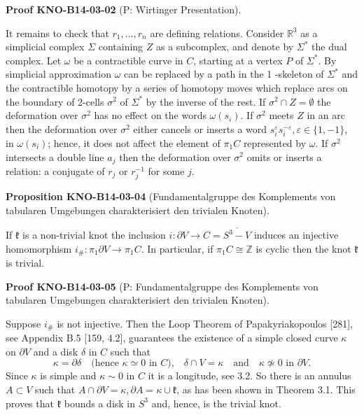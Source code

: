 \documentclass[10pt, letterpaper]{article}
\newcommand{\CustomHeading}[3]{%
  \par\medskip\noindent%
  \textbf{#1 #2} \textnormal{(#3)}.\enskip%
}
\newenvironment{PROP}[2]{\CustomHeading{Proposition}{#1}{#2}}{}
\newenvironment{PROOF}[2]{\CustomHeading{Proof}{#1}{#2}}{}
\begin{document}
\begin{PROOF}{KNO-B14-03-02}{P: Wirtinger Presentation}
It remains to check that $r_{1}, \ldots, r_{n}$ are defining relations. Consider $\mathbb{R}^{3}$ as a simplicial complex $\Sigma$ containing $Z$ as a subcomplex, and denote by $\Sigma^{*}$ the dual complex. Let $\omega$ be a contractible curve in $C$, starting at a vertex $P$ of $\Sigma^{*}$. By simplicial approximation $\omega$ can be replaced by a path in the 1 -skeleton of $\Sigma^{*}$ and the contractible homotopy by a series of homotopy moves which replace arcs on the boundary of 2-cells $\sigma^{2}$ of $\Sigma^{*}$ by the inverse of the rest. If $\sigma^{2} \cap Z=\emptyset$ the deformation over $\sigma^{2}$ has no effect on the words $\omega\left(s_{i}\right)$. If $\sigma^{2}$ meets $Z$ in an arc then the deformation over $\sigma^{2}$ either cancels or inserts a word $s_{i}^{\varepsilon} s_{i}^{-\varepsilon}, \varepsilon \in\{1,-1\}$, in $\omega\left(s_{i}\right)$; hence, it does not affect the element of $\pi_{1} C$ represented by $\omega$. If $\sigma^{2}$ intersects a double line $a_{j}$ then the deformation over $\sigma^{2}$ omits or inserts a relation: a conjugate of $r_{j}$ or $r_{j}^{-1}$ for some $j$.
\end{PROOF}

\begin{PROP}{KNO-B14-03-04}{Fundamentalgruppe des Komplements von tabularen Umgebungen charakterisiert den trivialen Knoten}
If $\mathfrak{k}$ is a non-trivial knot the inclusion $i: \partial V \rightarrow C=\overline{S^{3}-V}$ induces an injective homomorphism $i_{\#}: \pi_{1} \partial V \rightarrow \pi_{1} C$. In particular, if $\pi_{1} C \cong \mathbb{Z}$ is cyclic then the knot $\mathfrak{k}$ is trivial.
\end{PROP}

\begin{PROOF}{KNO-B14-03-05}{P: Fundamentalgruppe des Komplements von tabularen Umgebungen charakterisiert den trivialen Knoten}
Suppose $i_{\#}$ is not injective. Then the Loop Theorem of Papakyriakopoulos [281], see Appendix B.5 [159, 4.2], guarantees the existence of a simple closed curve $\kappa$ on $\partial V$ and a disk $\delta$ in $C$ such that
$$
\kappa = \partial \delta 
\quad \text{(hence } \kappa \simeq 0 \text{ in } C\text{),} \quad 
\delta \cap V = \kappa \quad \text{and} \quad 
\kappa \not\simeq 0 \text{ in } \partial V\text{.}
$$
Since $\kappa$ is simple and $\kappa \sim 0$ in $C$ it is a longitude, see 3.2. So there is an annulus $A \subset V$ such that $A \cap \partial V=\kappa, \partial A=\kappa \cup \mathfrak{k}$, as has been shown in Theorem 3.1. This proves that $\mathfrak{k}$ bounds a disk in $S^{3}$ and, hence, is the trivial knot.
\end{PROOF}
\end{document}
